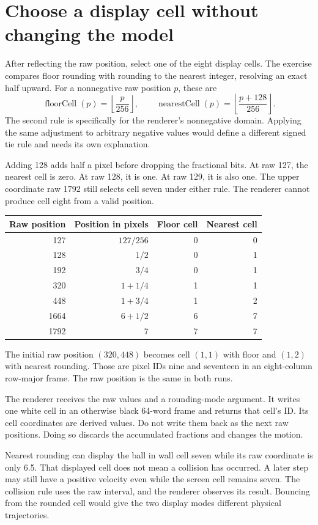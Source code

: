 \section{Choose a display cell without changing the model}
After reflecting the raw position, select one of the eight display cells. The
exercise compares floor rounding with rounding to the nearest integer, resolving
an exact half upward. For a nonnegative raw position \(p\), these are
\[
  \operatorname{floorCell}(p)=\left\lfloor\frac p{256}\right\rfloor,
  \qquad
  \operatorname{nearestCell}(p)=\left\lfloor\frac{p+128}{256}\right\rfloor.
\]
The second rule is specifically for the renderer's nonnegative domain. Applying
the same adjustment to arbitrary negative values would define a different signed
tie rule and needs its own explanation.

Adding 128 adds half a pixel before dropping the fractional bits. At raw 127,
the nearest cell is zero. At raw 128, it is one. At raw 129, it is also one.
The upper coordinate raw 1792 still selects cell seven under either rule. The
renderer cannot produce cell eight from a valid position.

\begin{longtable}{rrrr}
  \toprule
  Raw position & Position in pixels & Floor cell & Nearest cell \\
  \midrule
  127          & \(127/256\)        & 0          & 0            \\
  128          & \(1/2\)            & 0          & 1            \\
  192          & \(3/4\)            & 0          & 1            \\
  320          & \(1+1/4\)          & 1          & 1            \\
  448          & \(1+3/4\)          & 1          & 2            \\
  1664         & \(6+1/2\)          & 6          & 7            \\
  1792         & 7                  & 7          & 7            \\
  \bottomrule
\end{longtable}
The initial raw position \((320,448)\) becomes cell \((1,1)\) with floor and
\((1,2)\) with nearest rounding. Those are pixel IDs nine and seventeen in an
eight-column row-major frame. The raw position is the same in both runs.

The renderer receives the raw values and a rounding-mode argument. It writes one
white cell in an otherwise black 64-word frame and returns that cell's ID. Its
cell coordinates are derived values. Do not write them back as the next raw
positions. Doing so discards the accumulated fractions and changes the motion.

Nearest rounding can display the ball in wall cell seven while its raw coordinate
is only 6.5. That displayed cell does not mean a collision has occurred. A later
step may still have a positive velocity even while the screen cell remains seven.
The collision rule uses the raw interval, and the renderer observes its result.
Bouncing from the rounded cell would give the two display modes different physical
trajectories.
